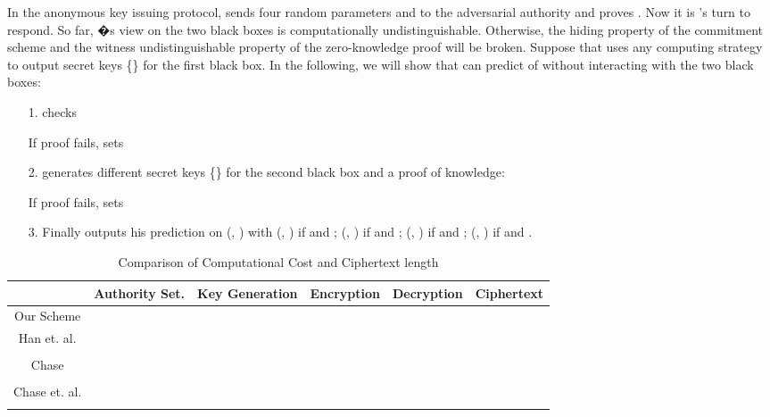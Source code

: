 \documentclass[10pt,journal]{IEEEtran}
\begin{document}
In the anonymous key issuing protocol,  sends four random parameters  and  to the adversarial authority  and proves . Now it is 's turn to respond. So far, �s view on the two black boxes is computationally undistinguishable. Otherwise, the hiding property of the commitment scheme and the witness undistinguishable property of the zero-knowledge proof will be broken. Suppose that  uses any computing strategy to output secret keys \{\} for the first black box. In the following, we will show that  can predict  of  without interacting with the two black boxes:

\begin{itemize}
  \item[1.]   checks
  \item[] 
  \item[] 
  \item[] If proof fails,  sets 
  \item[2.]  generates different secret keys \{\} for the second black box and a proof of knowledge:
      \item[] 
  \item[] 
  \item[] If proof fails,  sets 
  \item[3.] Finally  outputs his prediction on (, ) with (, ) if  and ; (, ) if  and ; (, ) if  and ; (, ) if  and .
\end{itemize}





\begin{table*}[!ht]\caption{Comparison of Computational Cost and Ciphertext length}
  \centering
\begin{tabular}{|c|c|c|c|c||c|}
  \hline
&\!\!\!\! Authority Set.\!\!\!\!   & Key Generation& Encryption    & Decryption            & Ciphertext \\ \hline
   \multirow{2}{*}{\!\!\!\!\!\!\!\!\!\!Our Scheme\!\!\!\!\!\!\!\!\!\!}    & \multirow{2}{*}{}      & &   &\!\!\!\!\!\!\!\!\!\!\!\!\!\!\!\!   &  \\
                                &                   &   & &          &  \\ \hline
  {Han et. al. }      & \multirow{2}{*}{}      &  &   &  &  \\
   \cite{main1}                 &                   &   & &          &  \\ \hline
 {Chase  }           & \multirow{2}{*}{}       & \multirow{2}{*}{} &\multirow{2}{*}{}&           &  \\
       \cite{maabe}                         &                   &               &               &      &  \\ \hline
  {\!\!\!\!Chase et. al. \!\!\!\!\!\!}   &  & &  &      &  \\
     \cite{imaabe}                &       & &                 &        &  \\
  \hline
\end{tabular}
\label{Table: Comparision}
\end{table*}
\end{document}
